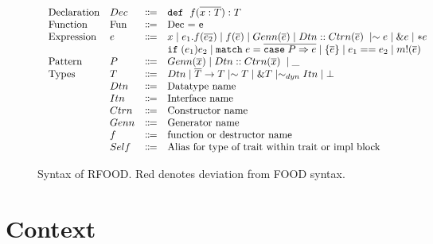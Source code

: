 \documentclass[ oneside,%
                    author={James Elgar},
                    degree={MEng},
                     title={Bidirectional transformer between functional and \\ object-oriented programming in Rust},
                  subtitle={}]{dissertation}
\begin{document}
\begin{figure}[t]
\begin{displaymath}
\begin{array}{l}
\begin{array}{llcl}
         \text{Declaration}
         & Dec & \Coloneqq & \dec {x: T} T\\
         \text{Function}
         & \text{Fun} & \text{$\Coloneqq$} & \text{Dec = e}\\
        \text{Expression}
         & e & \Coloneqq & x %
          \mid e_1.f(\overline{e_2})  \mid f(\overline{e}) \mid Genn(\overline{e}) \mid \ctrCall{Dtn}{Ctrn}{e} \mid \sim e\mid \&e \mid *e\\
         &   &           & \ifexpr{e_1}{e_2} \mid \matchexpr{e}{P}{e} \mid \blockexpr{e} \mid \eqexpr{e_1}{e_2} \mid \macroexpr{m}{e} \\
         \text{Pattern}
         & P & \Coloneqq & Genn(\overline{x}) \mid \ctrCall{Dtn}{Ctrn}{x} \mid \_ \\
        \text{Types}
        & T & \Coloneqq & Dtn \mid \overline{T} \rightarrow T \mid \sim  T \mid \& T \mid \sim_{dyn} Itn \mid \bot \\
        & Dtn & \Coloneqq & \text{Datatype name} \\
        & Itn & \Coloneqq & \text{Interface name} \\
        & Ctrn & \Coloneqq & \text{Constructor name} \\
        & Genn & \Coloneqq & \text{Generator name} \\
        & f & \Coloneqq & \text{function or destructor name} \\
        & Self & \Coloneqq & \text{Alias for type of trait within trait or impl block} \\
        
      \end{array}
    \end{array}
  \end{displaymath}
  \caption{Syntax of RFOOD. Red denotes deviation from FOOD syntax.}
  \label{fig:syntax}
\end{figure}

\section{Context}
\end{document}
